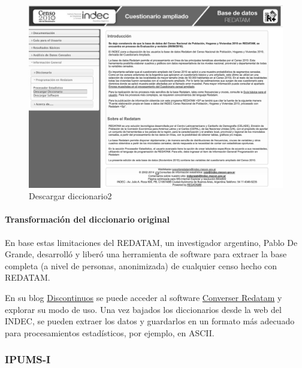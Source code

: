 \documentclass[
]{article}
\begin{document}
\begin{figure}

{\centering \includegraphics[width=0.8\linewidth]{imagenes_byn/dic2010} 

}

\caption{Descargar diccionario2}\label{fig:unnamed-chunk-37}
\end{figure}

\hypertarget{transformaciuxf3n-del-diccionario-original}{%
\paragraph{Transformación del diccionario original}\label{transformaciuxf3n-del-diccionario-original}}

En base estas limitaciones del REDATAM, un investigador argentino, Pablo De Grande, desarrolló y liberó una herramienta de software para extraer la base completa (a nivel de personas, anonimizada) de cualquier censo hecho con REDATAM.

En su blog \href{https://idiscontinuos.wordpress.com/2015/03/21/convirtiendo-bases-redatam-a-spss/}{Discontinuos} se puede acceder al software \href{https://www.aacademica.org/conversor.redatam}{Converser Redatam} y explorar su modo de uso. Una vez bajados los diccionarios desde la web del INDEC, se pueden extraer los datos y guardarlos en un formato más adecuado para procesamientos estadísticos, por ejemplo, en ASCII.

\hypertarget{ipums-i}{%
\subsubsection{IPUMS-I}\label{ipums-i}}
\end{document}
